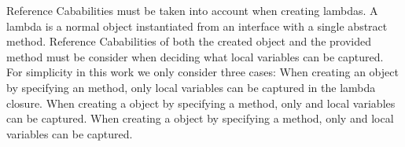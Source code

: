 Reference Cababilities must be taken into account when creating lambdas.
A lambda is a normal object instantiated from an interface with a single abstract method.
Reference Cababilities of both the created object and the provided method must be consider when deciding what local variables
can be captured.
For simplicity in this work we only consider three cases:
When creating an \Q@imm@ object by specifying an \Q@imm@ method, only \Q@imm@ local variables can be captured in the lambda closure.
When creating a \Q@capsule@ object by specifying a \Q@capsule@ method, only \Q@imm@ and \Q@capsule@ local variables can be captured.
When creating a \Q@mut@ object by specifying a \Q@mut@ method, only \Q@imm@ and \Q@mut@ local variables can be captured.